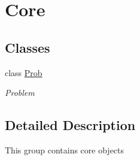 \hypertarget{group__group__core}{
\section{Core}
\label{group__group__core}
}
\subsection*{Classes}
\begin{DoxyCompactItemize}
\item 
class \hyperlink{classProb}{Prob}
\begin{DoxyCompactList}\small\item\em Problem \item\end{DoxyCompactList}\end{DoxyCompactItemize}


\subsection{Detailed Description}
This group contains core objects 